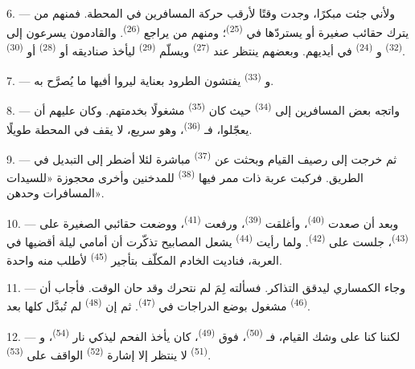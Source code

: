 6. --- ولأني جئت مبكرًا، وجدت وقتًا لأرقب حركة المسافرين في المحطة. فمنهم
من يترك حقائب صغيرة أو يستردّها في  \textsuperscript{(25)}؛
ومنهم من يراجع  \textsuperscript{(26)}. والقادمون يسرعون
إلى  \textsuperscript{(32)} و \textsuperscript{(24)} في
أيديهم. وبعضهم ينتظر عند  \textsuperscript{(27)} ويسلّم
 \textsuperscript{(29)} ليأخذ صناديقه أو 
\textsuperscript{(28)} أو  \textsuperscript{(30)}.

7. --- و \textsuperscript{(33)} يفتشون الطرود بعناية ليروا
أفيها ما يُصرَّح به.

8. --- واتجه بعض المسافرين إلى  \textsuperscript{(34)} حيث
كان  \textsuperscript{(35)} مشغولًا بخدمتهم. وكان عليهم أن يعجّلوا،
فـ \textsuperscript{(36)}، وهو سريع، لا يقف في المحطة طويلًا.

9. --- ثم خرجت إلى رصيف القيام وبحثت عن  \textsuperscript{(37)}
مباشرة لئلا أضطر إلى التبديل في الطريق. فركبت عربة ذات ممر فيها
 \textsuperscript{(38)} للمدخنين وأخرى محجوزة «للسيدات المسافرات
وحدهن».

\VUsaut{3.0mm}

10. --- وبعد أن صعدت  \textsuperscript{(40)}، وأغلقت 
\textsuperscript{(39)}، ورفعت  \textsuperscript{(41)}، ووضعت حقائبي
الصغيرة على  \textsuperscript{(43)}، جلست على 
\textsuperscript{(42)}. ولما رأيت  \textsuperscript{(44)} يشعل
المصابيح تذكّرت أن أمامي ليلة أقضيها في العربة، فناديت الخادم المكلّف
بتأجير  \textsuperscript{(45)} لأطلب منه واحدة.

11. --- وجاء الكمساري ليدقق التذاكر. فسألته لِمَ لم نتحرك وقد حان الوقت.
فأجاب أن  \textsuperscript{(46)} مشغول بوضع الدراجات في
 \textsuperscript{(47)}. ثم إن 
\textsuperscript{(48)} لم تُبدَّل كلها بعد.

12. --- لكننا كنا على وشك القيام، فـ \textsuperscript{(50)}، فوق
 \textsuperscript{(49)}، كان يأخذ الفحم ليذكي نار
 \textsuperscript{(54)}، و \textsuperscript{(51)} لا ينتظر
إلا إشارة  \textsuperscript{(52)} الواقف على
 \textsuperscript{(53)}.

